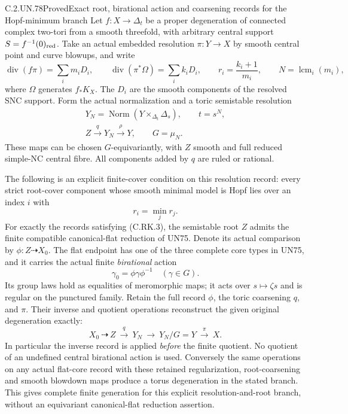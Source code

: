 \begin{statement}{C.2.UN.78}{Proved}{Exact root, birational action and coarsening records for the Hopf-minimum branch}
Let $f:X\to\Delta_t$ be a proper degeneration of connected
complex two-tori from a smooth threefold, with arbitrary
central support $S=f^{-1}(0)_{\rm red}$. Take an actual
embedded resolution $\pi:Y\to X$ by smooth central
point and curve blowups, and write
\[
 \operatorname{div}(f\pi)=\sum_i m_iD_i,
 \qquad \operatorname{div}(\pi^*\Omega)=\sum_i k_iD_i,
 \qquad r_i=\frac{k_i+1}{m_i},
 \qquad N=\operatorname{lcm}_i(m_i),
\tag{C.RK.1}
\]
where $\Omega$ generates $f_*K_X$. The $D_i$ are the
smooth components of the resolved SNC support. Form
the actual normalization and a toric semistable
resolution
\[
 \begin{gathered}
 Y_N=\operatorname{Norm}(Y\times_{\Delta_t}\Delta_s),
                \qquad t=s^N,\\
 Z\xrightarrow{\ q\ }Y_N\xrightarrow{\ \rho\ }Y,
                 \qquad G=\mu_N.
 \end{gathered}
\tag{C.RK.2}
\]
These maps can be chosen $G$-equivariantly, with $Z$
smooth and full reduced simple-NC central fibre.
All components added by $q$ are ruled or rational.

The following is an explicit finite-cover condition
on this resolution record: every strict root-cover
component whose smooth minimal model is Hopf lies
over an index $i$ with
\[
                            r_i=\min_j r_j.
\tag{C.RK.3}
\]
For exactly the records satisfying (C.RK.3), the
semistable root $Z$ admits the finite compatible
canonical-flat reduction of UN75. Denote its
actual comparison by $\phi:Z\dashrightarrow X_0$.
The flat endpoint has one of the three complete
core types in UN75, and it carries the actual
finite \emph{birational} action
\[
                 \gamma_0=\phi\gamma\phi^{-1}
                 \quad (\gamma\in G).
\tag{C.RK.4}
\]
Its group laws hold as equalities of meromorphic
maps; it acts over $s\mapsto\zeta s$ and is regular
on the punctured family. Retain the full record
$\phi$, the toric coarsening $q$, and $\pi$.
Their inverse and quotient operations reconstruct
the given original degeneration exactly:
\[
 X_0\ \dashrightarrow\ Z\ \xrightarrow{q}\ Y_N
       \ \longrightarrow\ Y_N/G=Y
       \ \xrightarrow{\pi}\ X.
\tag{C.RK.5}
\]
In particular the inverse record is applied
\emph{before} the finite quotient. No quotient of
an undefined central birational action is used.
Conversely the same operations on any actual
flat-core record with these retained regularization,
root-coarsening and smooth blowdown maps produce
a torus degeneration in the stated branch.
This gives complete finite generation for this
explicit resolution-and-root branch, without
an equivariant canonical-flat reduction assertion.


\end{statement}
